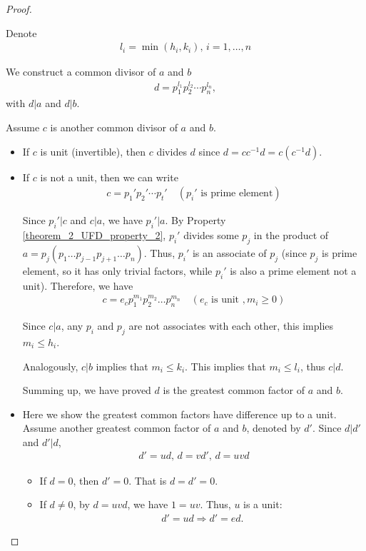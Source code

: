 \documentclass[utf8]{ctexbook}
\begin{document}
\begin{proof}
\begin{enumerate}
{Denote
\begin{align*}
 l_i = \min ( h_i, k_i), \, i = 1, \ldots , n
\end{align*}

We construct a common divisor of $a$ and $b$ 
\begin{align*}
d = p_1 ^{l_1} p_2 ^{l_2} \cdots  p_n ^{l_n} ,
\end{align*}
with $d | a$ and $d | b$.

Assume $c$ is another common divisor of $a$ and $b$.

\begin{itemize}
\item{If $c$ is unit (invertible), then $c$ divides $d$ since $d = c c^{-1} d = c (c^{-1} d)$.}
\item{If $c$ is not a unit, then we can write
\begin{align*}
c = p_1 ' p_2 ' \cdots p_t ' \quad (p_i ' \mbox{ is prime element})
\end{align*}

Since $p_i ' | c$ and $c|a$, we have $p_i ' | a$. By Property \ref{theorem_2_UFD_property_2}, $p_i '$ divides some $p_j$ in the product of $a = p_j (p_1 \ldots p_{j-1} p_{j+1} \ldots p_n ) $. Thus, $p_i '$ is an associate of $p_j$ (since $p_j$ is prime element, so it has only trivial factors, while $p_i '$ is also a prime element not a unit). Therefore, we have
\begin{align*}
c = e_c p_1 ^{m_1} p_2 ^{m_2} \ldots p_n ^{m_n} \quad (e_c \mbox{ is unit }, m_i \geq 0) 
\end{align*}  

Since $c | a$, any $p_i$ and $p_j$ are not associates with each other, this implies $m_i \leq h_i$.

Analogously, $c | b$ implies that $m_i \leq k_i$. This implies that $m_i \leq l_i$, thus $c | d$.

Summing up, we have proved $d$ is the greatest common factor of $a$ and $b$.
}
\item{Here we show the greatest common factors have difference up to a unit. Assume another greatest common factor of $a$ and $b$, denoted by $d'$. Since $d | d'$ and $d' | d$, 
\begin{align*}
d' = u d, \, d = v d', \, d = uv d
\end{align*}

\begin{itemize}
\item{If $d = 0 $, then $d' = 0$. That is $d = d' =0$.
}
\item{If $d \neq 0$, by $d = uv d$, we have $ 1 = u v$. Thus, $u$ is a unit:
\begin{align*}
d' = u d \Longrightarrow d' = e d .
\end{align*}
}
\end{itemize}

}
\end{itemize}


}
\end{enumerate}

\end{proof}
\end{document}
